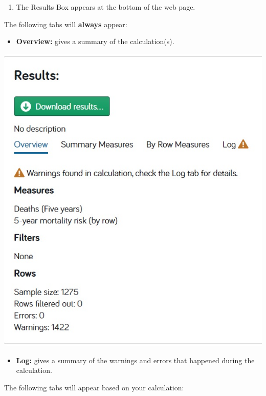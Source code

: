 \documentclass[]{book}
\providecommand{\tightlist}{%
  \setlength{\itemsep}{0pt}\setlength{\parskip}{0pt}}
\begin{document}
\begin{enumerate}
\def\labelenumi{\arabic{enumi}.}
\setcounter{enumi}{1}
\tightlist
\item
  The Results Box appears at the bottom of the web page.
\end{enumerate}

The following tabs will \textbf{always} appear:

\begin{itemize}
\tightlist
\item
  \textbf{Overview:} gives a summary of the calculation(s).
\end{itemize}

\begin{center}\includegraphics{Images/Results-Overview} \end{center}

\begin{itemize}
\tightlist
\item
  \textbf{Log:} gives a summary of the warnings and errors that happened
  during the calculation.
\end{itemize}

The following tabs will appear based on your calculation:
\end{document}
